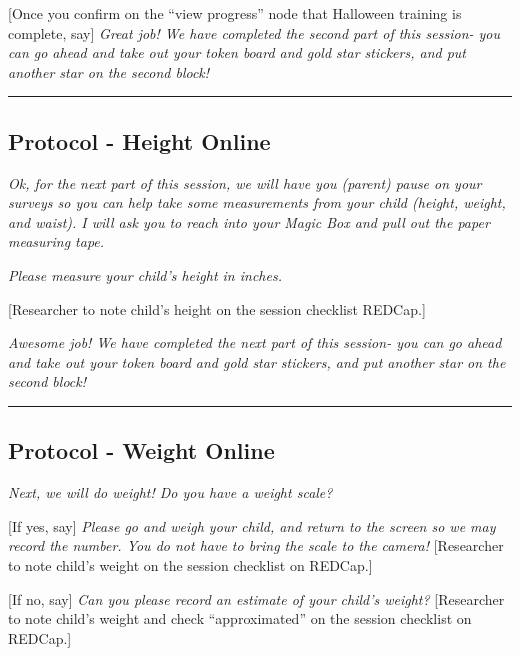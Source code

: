 \documentclass[]{book}
\begin{document}
{[}Once you confirm on the ``view progress'' node that Halloween training is complete, say{]} \emph{Great job! We have completed the second part of this session- you can go ahead and take out your token board and gold star stickers, and put another star on the second block!}

\begin{center}\rule{0.5\linewidth}{0.5pt}\end{center}

\hypertarget{protocol---height-online-2}{%
\subsection{Protocol - Height Online}\label{protocol---height-online-2}}

\emph{Ok, for the next part of this session, we will have you (parent) pause on your surveys so you can help take some measurements from your child (height, weight, and waist). I will ask you to reach into your Magic Box and pull out the paper measuring tape.}

\emph{Please measure your child's height in inches.}

{[}Researcher to note child's height on the session checklist REDCap.{]}

\emph{Awesome job! We have completed the next part of this session- you can go ahead and take out your token board and gold star stickers, and put another star on the second block!}

\begin{center}\rule{0.5\linewidth}{0.5pt}\end{center}

\hypertarget{protocol---weight-online-2}{%
\subsection{Protocol - Weight Online}\label{protocol---weight-online-2}}

\emph{Next, we will do weight! Do you have a weight scale?}

{[}If yes, say{]} \emph{Please go and weigh your child, and return to the screen so we may record the number. You do not have to bring the scale to the camera!} {[}Researcher to note child's weight on the session checklist on REDCap.{]}

{[}If no, say{]} \emph{Can you please record an estimate of your child's weight?} {[}Researcher to note child's weight and check ``approximated'' on the session checklist on REDCap.{]}
\end{document}
